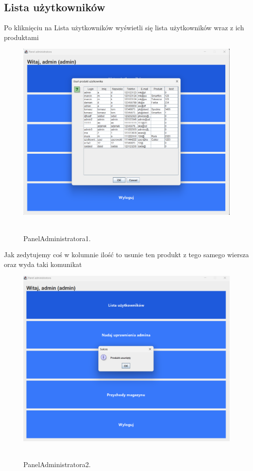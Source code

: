 \subsection{Lista użytkowników}
\label{subsec:Lista użytkowników}
Po kliknięciu na Lista użytkowników wyświetli się lista użytkowników wraz z ich produktami
\begin{figure}[H]
    \centering
    \includegraphics[width=.7\linewidth]{figures/PanelAdministratora1.png}\
    \caption{PanelAdministratora1.\label{PanelAdministratora1}}
\end{figure}
Jak zedytujemy coś w kolumnie ilość to usunie ten produkt z tego samego wiersza oraz wyda taki komunikat
\begin{figure}[H]
    \centering
    \includegraphics[width=.7\linewidth]{figures/PanelAdministratora2.png}\
    \caption{PanelAdministratora2.\label{PanelAdministratora2}}
\end{figure}
\clearpage
